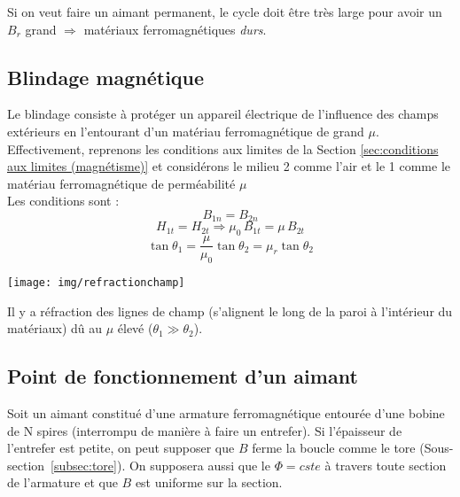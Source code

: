 \documentclass	[11pt, a4paper, openany]{book}
\begin{document}
	Si on veut faire un aimant permanent, le cycle doit être très large pour avoir un $B_r$ grand $\Rightarrow$ matériaux ferromagnétiques \textit{durs}. 
	\subsection{Blindage magnétique}
	Le blindage consiste à protéger un appareil électrique de l'influence des champs extérieurs en l'entourant d'un matériau ferromagnétique de grand $\mu$.\\
	
	Effectivement, reprenons les conditions aux limites de la Section \ref{sec:conditions aux limites (magnétisme)} et considérons le milieu 2 comme l'air et le 1 comme le matériau ferromagnétique de perméabilité $\mu$\\
	Les conditions sont :$$
	B_{1n} =B_{2n}$$\begin{equation}
	H_{1t} =H_{2t}\Rightarrow \mu_0\,B_{1t}=\mu\,B_{2t}\end{equation}$$
	\tan\theta_1 =\frac{\mu}{\mu_0}\tan\theta_2=\mu_r\tan\theta_2$$
	\begin{center}
		\texttt{[image: img/refractionchamp]}
	\end{center}
	Il y a réfraction des lignes de champ (s'alignent le long de la paroi à l'intérieur du matériaux) dû au $\mu$ élevé ($\theta_1\gg\theta_2$).
	\subsection{Point de fonctionnement d'un aimant}
	Soit un aimant constitué d'une armature ferromagnétique entourée d'une bobine de N spires (interrompu de manière à faire un entrefer). Si l'épaisseur de l'entrefer est petite, on peut supposer que $B$ ferme la boucle comme le tore (Sous-section~\ref{subsec:tore}). On supposera aussi que le $\Phi=cste$ à travers toute section de l'armature et que $B$ est uniforme sur la section.\\
	
\end{document}

